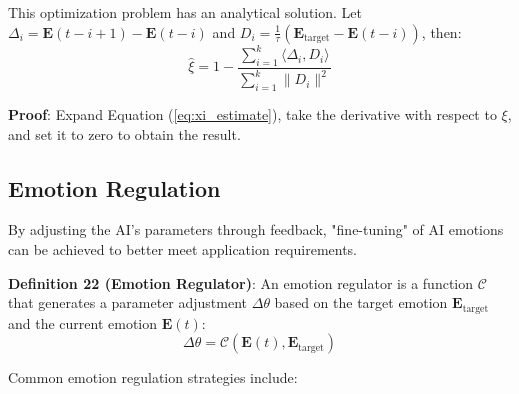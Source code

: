 \documentclass[12pt,a4paper]{article}
\theoremstyle{plain}
\newcommand{\ve}[1]{\bm{#1}}                    %
\newcommand{\Evec}{\ve{E}}                        %
\begin{document}
This optimization problem has an analytical solution. Let $\Delta_i = \Evec(t-i+1) - \Evec(t-i)$ and $D_i = \frac{1}{\tau}(\Evec_{\text{target}} - \Evec(t-i))$, then:
\begin{equation}
\hat{\xi} = 1 - \frac{\sum_{i=1}^k \langle \Delta_i, D_i \rangle}{\sum_{i=1}^k \|D_i\|^2}
\label{eq:xi_solution}
\end{equation}

\textbf{Proof}: Expand Equation (\ref{eq:xi_estimate}), take the derivative with respect to $\xi$, and set it to zero to obtain the result.

\subsection{Emotion Regulation}

By adjusting the AI's parameters through feedback, "fine-tuning" of AI emotions can be achieved to better meet application requirements.

\textbf{Definition 22 (Emotion Regulator)}: An emotion regulator is a function $\mathcal{C}$ that generates a parameter adjustment $\Delta \theta$ based on the target emotion $\Evec_{\text{target}}$ and the current emotion $\Evec(t)$:
\begin{equation}
\Delta \theta = \mathcal{C}(\Evec(t), \Evec_{\text{target}})
\label{eq:regulator}
\end{equation}

Common emotion regulation strategies include:
\end{document}
